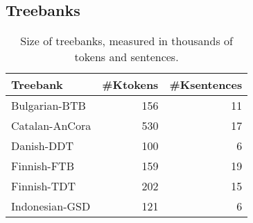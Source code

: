 \subsection{Treebanks}

\begin{table}[t!]
    \centering\small
    \begin{tabular}{lrr}\toprule
        Treebank       & \multicolumn{1}{l}{\#Ktokens} & \multicolumn{1}{l}{\#Ksentences} \\ \midrule
        Bulgarian-BTB  & 156                           & 11                               \\
        Catalan-AnCora & 530                           & 17                               \\
        Danish-DDT     & 100                           & 6                                \\
        Finnish-FTB    & 159                           & 19                               \\
        Finnish-TDT    & 202                           & 15                               \\
        Indonesian-GSD & 121                           & 6                                \\
        \bottomrule
    \end{tabular}
    \caption{Size of treebanks, measured in thousands of tokens and sentences.}
    \label{tab:treeb}
\end{table}

